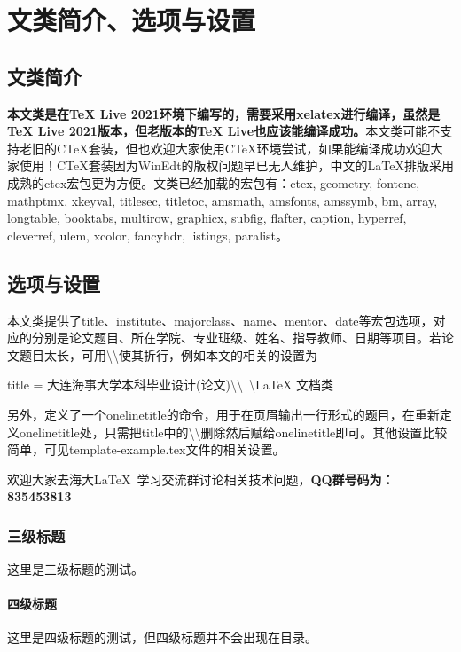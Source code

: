\centerline{\bf{}\onelinetitle}
\section{文类简介、选项与设置}
\subsection{文类简介}
\textbf{本文类是在TeX Live 2021环境下编写的，需要采用xelatex进行编译，虽然是TeX Live 2021版本，但老版本的TeX Live也应该能编译成功。}本文类可能不支持老旧的CTeX套装，但也欢迎大家使用CTeX环境尝试，如果能编译成功欢迎大家使用！CTeX套装因为WinEdt的版权问题早已无人维护，中文的LaTeX排版采用成熟的ctex宏包更为方便。文类已经加载的宏包有：ctex, geometry, fontenc, mathptmx, xkeyval, titlesec, titletoc, amsmath, amsfonts, amssymb, bm, array, longtable, booktabs, multirow, graphicx, subfig, flafter, caption, hyperref, cleverref, ulem, xcolor, fancyhdr, listings, paralist。
\subsection{选项与设置}
本文类提供了title、institute、majorclass、name、mentor、date等宏包选项，对应的分别是论文题目、所在学院、专业班级、姓名、指导教师、日期等项目。若论文题目太长，可用\textbackslash\textbackslash 使其折行，例如本文的相关的设置为

\centerline{title = 大连海事大学本科毕业设计(论文)\textbackslash\textbackslash\ \textbackslash LaTeX 文档类}

另外，定义了一个onelinetitle的命令，用于在页眉输出一行形式的题目，在重新定义onelinetitle处，只需把title中的\textbackslash\textbackslash 删除然后赋给onelinetitle即可。其他设置比较简单，可见template-example.tex文件的相关设置。

欢迎大家去海大\LaTeX\ 学习交流群讨论相关技术问题，\textbf{QQ群号码为：835453813}
\subsubsection{三级标题}
这里是三级标题的测试。
\paragraph{四级标题}
这里是四级标题的测试，但四级标题并不会出现在目录。